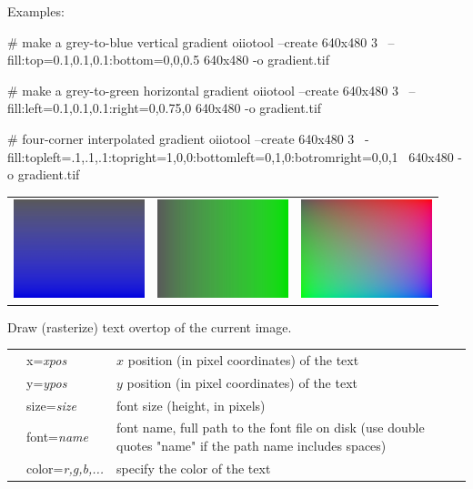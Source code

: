 \noindent Examples:

\begin{smallcode}
    # make a grey-to-blue vertical gradient
    oiiotool --create 640x480 3 \
        --fill:top=0.1,0.1,0.1:bottom=0,0,0.5 640x480 -o gradient.tif

    # make a grey-to-green horizontal gradient
    oiiotool --create 640x480 3 \
        --fill:left=0.1,0.1,0.1:right=0,0.75,0 640x480 -o gradient.tif
\end{smallcode}
\begin{tinycode}
    # four-corner interpolated gradient
    oiiotool --create 640x480 3 \
        -fill:topleft=.1,.1,.1:topright=1,0,0:bottomleft=0,1,0:botromright=0,0,1 \
            640x480 -o gradient.tif
\end{tinycode}
\noindent \begin{tabular}{lll}
\includegraphics[width=1.5in]{figures/gradient.jpg} &
 \includegraphics[width=1.5in]{figures/gradienth.jpg} &
 \includegraphics[width=1.5in]{figures/gradient4.jpg}
\end{tabular}

\apiend


Draw (rasterize) text overtop of the current image.

\begin{tabular}{p{10pt} p{1in} p{3.75in}}
 & {\cf x=}\emph{xpos} & $x$ position (in pixel coordinates) of the text \\
 & {\cf y=}\emph{ypos} & $y$ position (in pixel coordinates) of the text  \\
 & {\cf size=}\emph{size} & font size (height, in pixels) \\
 & {\cf font=}\emph{name} & font name, full path to the font file on
  disk (use double quotes {\cf "name"} if the path name includes spaces) \\
 & {\cf color=}\emph{r,g,b,...} & specify the color of the text \\
\end{tabular}

